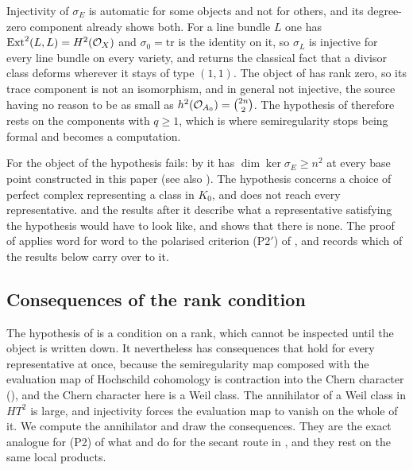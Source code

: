 \begin{remark}
\label{rem:semiregunavailable}
Injectivity of $\sigma_{E}$ is automatic for some objects and not for
others, and its degree-zero component already shows both. For a line bundle
$L$ one has $\operatorname{Ext}^{2}(L,L)=H^{2}(\mathcal{O}_{X})$ and $\sigma_{0}=\mathrm{tr}$ is the
identity on it, so $\sigma_{L}$ is injective for every line bundle on every
variety, and  returns the classical fact that a divisor class
deforms wherever it stays of type $(1,1)$. The object of 
has rank zero, so its trace component is not an isomorphism, and in general
not injective, the source having no reason to be as small as
$h^{2}(\mathcal{O}_{A_{0}})=\binom{2n}{2}$. The hypothesis of
 therefore rests on the components with $q\ge1$,
which is where semiregularity stops being formal and becomes a computation.

For the object of  the hypothesis fails: by
 it has $\dim\ker\sigma_{E}\ge n^{2}$ at every base
point constructed in this paper (see also ). The
hypothesis concerns a choice of perfect complex representing a class in
$K_{0}$, and  does not reach every representative.
 and the results after it describe what a representative
satisfying the hypothesis would have to look like, and 
shows that there is none. The proof of  applies word
for word to the polarised criterion \textup{(P2$'$)} of ,
and  records which of the results below carry over
to it.
\end{remark}

\subsection{Consequences of the rank condition}

The hypothesis of  is a condition on a rank, which
cannot be inspected until the object is written down. It nevertheless has
consequences that hold for every representative at once, because the
semiregularity map composed with the evaluation map of Hochschild cohomology
is contraction into the Chern character (), and the
Chern character here is a Weil class. The annihilator of a Weil class in
$HT^{2}$ is large, and injectivity forces the evaluation map to vanish on the
whole of it. We compute the annihilator and draw the consequences. They are
the exact analogue for (P2) of what  and
 do for the secant route in , and
they rest on the same local products.

